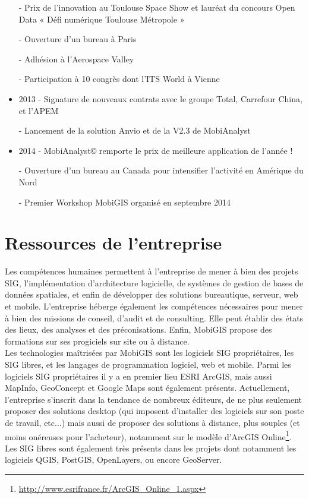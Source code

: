 \begin{itemize}
		- Prix de l'innovation au Toulouse Space Show et lauréat du concours Open Data « Défi numérique Toulouse Métropole » 
    
		- Ouverture d'un bureau à Paris 
    
		- Adhésion à l'Aerospace Valley 
    
		- Participation à 10 congrès dont l'ITS World à Vienne 
\\
\item 2013 
    - Signature de nouveaux contrats avec le groupe Total, Carrefour China, et l'APEM 
    
		- Lancement de la solution Anvio et de la V2.3 de MobiAnalyst 
\\
\item 2014
    - MobiAnalyst© remporte le prix de meilleure application de l'année !
    
		- Ouverture d'un bureau au Canada pour intensifier l'activité en Amérique du Nord
    
		- Premier Workshop MobiGIS organisé en septembre 2014 

\end{itemize}



\section{Ressources de l'entreprise}

Les compétences humaines permettent à l'entreprise de mener à bien des projets SIG, l'implémentation d'architecture logicielle, de systèmes de gestion de bases de données spatiales, et enfin de développer des solutions bureautique, serveur, web et mobile. 
L'entreprise héberge également les compétences nécessaires pour mener à bien des missions de conseil, d'audit et de consulting. Elle peut établir des états des lieux, des analyses et des préconisations. Enfin, MobiGIS propose des formations sur ses progiciels sur site ou à distance. \\

Les technologies maîtrisées par MobiGIS sont les logiciels SIG propriétaires, les SIG libres, et les langages de programmation logiciel, web et mobile. Parmi les logiciels SIG propriétaires il y a en premier lieu ESRI ArcGIS, mais aussi MapInfo, GeoConcept et Google Maps sont également présents. Actuellement, l'entreprise s'inscrit dans la tendance de nombreux éditeurs, de ne plus seulement proposer des solutions desktop (qui imposent d'installer des logiciels sur son poste de travail, etc...) mais aussi de proposer des solutions à distance, plus souples (et moins onéreuses pour l'acheteur), notamment sur le modèle d'ArcGIS Online\footnote{\url{http://www.esrifrance.fr/ArcGIS_Online_1.aspx}}. Les SIG libres sont également très présents dans les projets dont notamment les logiciels QGIS, PostGIS, OpenLayers, ou encore GeoServer. \\

